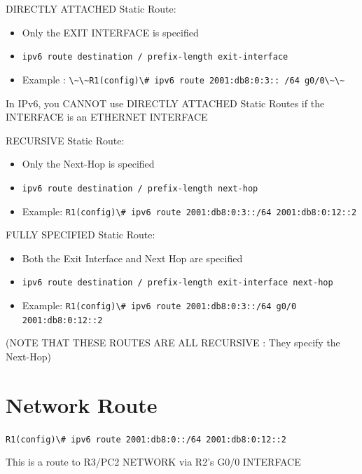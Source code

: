 DIRECTLY ATTACHED Static Route:

\begin{itemize}
\tightlist
\item
  Only the EXIT INTERFACE is specified
\item
  \passthrough{\lstinline!ipv6 route destination / prefix-length exit-interface!}
\item
  Example :
  \passthrough{\lstinline!\~\~R1(config)\# ipv6 route 2001:db8:0:3:: /64 g0/0\~\~!}
\end{itemize}

\begin{tipbox}

In IPv6, you CANNOT use DIRECTLY ATTACHED Static Routes if the INTERFACE
is an ETHERNET INTERFACE

\end{tipbox}

RECURSIVE Static Route:

\begin{itemize}
\tightlist
\item
  Only the Next-Hop is specified
\item
  \passthrough{\lstinline!ipv6 route destination / prefix-length next-hop!}
\item
  Example:
  \passthrough{\lstinline!R1(config)\# ipv6 route 2001:db8:0:3::/64 2001:db8:0:12::2!}
\end{itemize}

FULLY SPECIFIED Static Route:

\begin{itemize}
\tightlist
\item
  Both the Exit Interface and Next Hop are specified
\item
  \passthrough{\lstinline!ipv6 route destination / prefix-length exit-interface next-hop!}
\item
  Example:
  \passthrough{\lstinline!R1(config)\# ipv6 route 2001:db8:0:3::/64 g0/0 2001:db8:0:12::2!}
\end{itemize}

(NOTE THAT THESE ROUTES ARE ALL RECURSIVE : They specify the Next-Hop)

\section{Network Route}\label{network-route}

\passthrough{\lstinline!R1(config)\# ipv6 route 2001:db8:0::/64 2001:db8:0:12::2!}

This is a route to R3/PC2 NETWORK via R2's G0/0 INTERFACE

